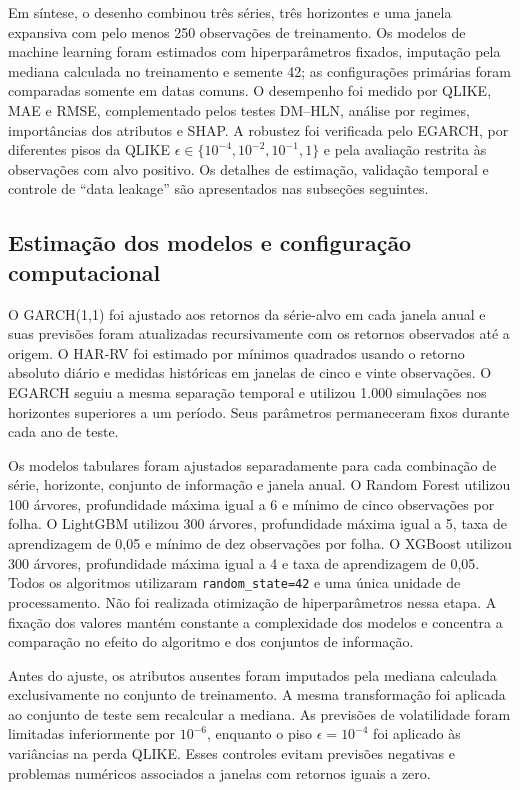 \documentclass[a4paper,fleqn]{cas-sc}
\begin{document}
Em síntese, o desenho combinou três séries, três horizontes e uma janela expansiva com pelo menos 250 observações de treinamento. Os modelos de machine learning foram estimados com hiperparâmetros fixados, imputação pela mediana calculada no treinamento e semente 42; as configurações primárias foram comparadas somente em datas comuns. O desempenho foi medido por QLIKE, MAE e RMSE, complementado pelos testes DM--HLN, análise por regimes, importâncias dos atributos e SHAP. A robustez foi verificada pelo EGARCH, por diferentes pisos da QLIKE \(\epsilon\in\{10^{-4},10^{-2},10^{-1},1\}\) e pela avaliação restrita às observações com alvo positivo. Os detalhes de estimação, validação temporal e controle de “data leakage” são apresentados nas subseções seguintes.

\subsection{Estimação dos modelos e configuração computacional}
\label{subsec:experiment_implementation}

O GARCH(1,1) foi ajustado aos retornos da série-alvo em cada janela anual e suas previsões foram atualizadas recursivamente com os retornos observados até a origem. O HAR-RV foi estimado por mínimos quadrados usando o retorno absoluto diário e medidas históricas em janelas de cinco e vinte observações. O EGARCH seguiu a mesma separação temporal e utilizou 1.000 simulações nos horizontes superiores a um período. Seus parâmetros permaneceram fixos durante cada ano de teste.

Os modelos tabulares foram ajustados separadamente para cada combinação de série, horizonte, conjunto de informação e janela anual. O Random Forest utilizou 100 árvores, profundidade máxima igual a 6 e mínimo de cinco observações por folha. O LightGBM utilizou 300 árvores, profundidade máxima igual a 5, taxa de aprendizagem de 0,05 e mínimo de dez observações por folha. O XGBoost utilizou 300 árvores, profundidade máxima igual a 4 e taxa de aprendizagem de 0,05. Todos os algoritmos utilizaram \texttt{random\_state=42} e uma única unidade de processamento. Não foi realizada otimização de hiperparâmetros nessa etapa. A fixação dos valores mantém constante a complexidade dos modelos e concentra a comparação no efeito do algoritmo e dos conjuntos de informação.

Antes do ajuste, os atributos ausentes foram imputados pela mediana calculada exclusivamente no conjunto de treinamento. A mesma transformação foi aplicada ao conjunto de teste sem recalcular a mediana. As previsões de volatilidade foram limitadas inferiormente por \(10^{-6}\), enquanto o piso \(\epsilon=10^{-4}\) foi aplicado às variâncias na perda QLIKE. Esses controles evitam previsões negativas e problemas numéricos associados a janelas com retornos iguais a zero.
\end{document}
